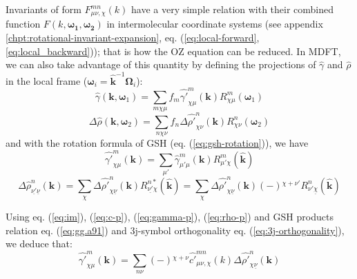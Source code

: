 Invariants of form $F_{\mu\nu,\chi}^{mn}(k)$ have a very simple relation
with their combined function $F(k,\boldsymbol{\omega_{1}},\boldsymbol{\omega_{2}})$
in intermolecular coordinate systems (see appendix \ref{chpt:rotational-invariant-expansion},
eq. (\ref{eq:local-forward}, \ref{eq:local_backward})); that is
how the \acs{OZ} equation can be reduced. In \acs{MDFT}, we can
also take advantage of this quantity by defining the projections of
$\hat{\gamma}$ and $\hat{\rho}$ in the local frame ($\boldsymbol{\omega}_{i}=\hat{\mathbf{k}}^{-1}\mathbf{\Omega}_{i}$):
\begin{equation}
\hat{\gamma}(\mathbf{k},\boldsymbol{\omega}_{1})=\sum_{m\chi\mu}f_{m}\hat{\gamma'}_{\chi\mu}^{m}(\mathbf{k})R_{\chi\mu}^{m}(\boldsymbol{\omega}_{1})\label{eq:gamma-projection-local}
\end{equation}
\begin{equation}
\Delta\hat{\rho}(\mathbf{k},\boldsymbol{\omega}_{2})=\sum_{n\chi\nu}f_{n}\Delta\hat{\rho'}_{\chi\nu}^{n}(\mathbf{k})R_{\chi\nu}^{n}(\mathbf{\boldsymbol{\omega}}_{2})\label{eq:delta-rho-projection-local}
\end{equation}
and with the rotation formula of \acs{GSH} (eq. (\ref{eq:gsh-rotation})),
we have 
\begin{equation}
\hat{\gamma'}_{\chi\mu}^{m}(\mathbf{k})=\sum_{\mu'}\hat{\gamma}_{\mu'\mu}^{m}(\mathbf{k})R_{\mu'\chi}^{m}(\hat{\mathbf{k}})\label{eq:gamma-p}
\end{equation}
\begin{equation}
\Delta\hat{\rho}_{\underline{\nu'}\underline{\nu}}^{n}(\mathbf{k})=\sum_{\chi}\Delta\hat{\rho'}_{\chi\underline{\nu}}^{n}(\mathbf{k})R_{\underline{\nu'}\chi}^{n*}(\hat{\mathbf{k}})=\sum_{\chi}\Delta\hat{\rho'}_{\chi\underline{\nu}}^{n}(\mathbf{k})\left(-\right){}^{\chi+\nu'}R_{\nu'\underline{\chi}}^{n}(\hat{\mathbf{k}})\label{eq:rho-p}
\end{equation}

Using eq. (\ref{eq:im}), (\ref{eq:c-p}), (\ref{eq:gamma-p}), (\ref{eq:rho-p})
and \acs{GSH} products relation eq. (\ref{eq:gg.a91}) and 3j-symbol
orthogonality eq. (\ref{eq:3j-orthogonality}), we deduce that:
\begin{equation}
\hat{\gamma'}_{\chi\mu}^{m}(\mathbf{k})=\sum_{n\nu}\left(-\right){}^{\chi+\nu}\hat{c'}_{\mu\nu,\chi}^{mn}(k)\Delta\hat{\rho'}_{\chi\underline{\nu}}^{n}(\mathbf{k})\label{eq:gamma-blum}
\end{equation}

